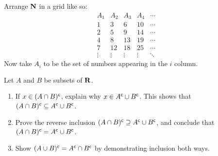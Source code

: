 \documentclass{lew98_solutions}
\begin{document}
\begin{solution}
    Arrange \( \mathbf{N} \) in a grid like so:
    \[
        \begin{array}{c|c|c|c|c}
                A_1 & A_2 & A_3 & A_4 & \cdots \\
                \hline
                1 & 3 & 6 & 10 & \cdots \\
                2 & 5 & 9 & 14 & \cdots \\
                4 & 8 & 13 & 19 & \cdots \\
                7 & 12 & 18 & 25 & \cdots \\
                \vdots & \vdots & \vdots & \vdots & \ddots
        \end{array}
    \]
    Now take \( A_i \) to be the set of numbers appearing in the \( i \) column.
\end{solution}

\begin{exercise}
\label{ex:1.2.5}
    Let \( A \) and \( B \) be subsets of \( \mathbf{R} \).
    \begin{enumerate}
        \item If \( x \in (A \cap B)^{\mathsf{c}} \), explain why \( x \in A^{\mathsf{c}} \cup B^{\mathsf{c}} \). This shows that \( (A \cap B)^{\mathsf{c}} \subseteq A^{\mathsf{c}} \cup B^{\mathsf{c}} \).

        \item Prove the reverse inclusion \( (A \cap B)^{\mathsf{c}} \supseteq A^{\mathsf{c}} \cup B^{\mathsf{c}} \), and conclude that \( (A \cap B)^{\mathsf{c}} = A^{\mathsf{c}} \cup B^{\mathsf{c}} \).

        \item Show \( (A \cup B)^{\mathsf{c}} = A^{\mathsf{c}} \cap B^{\mathsf{c}} \) by demonstrating inclusion both ways.
    \end{enumerate}
\end{exercise}
\end{document}
